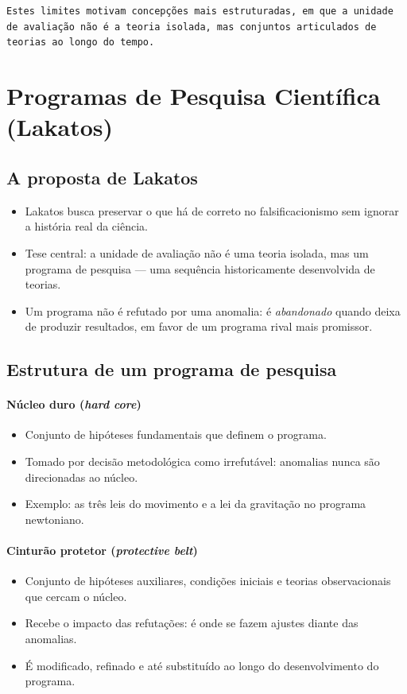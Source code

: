 \documentclass[9pt,a4paper]{extarticle}
\newcommand{\impt}[1]{\textcolor{important}{#1}}
\newcommand{\ntc}[1]{\textcolor{notice}{#1}}
\begin{document}
\texttt{Estes limites motivam concepções mais estruturadas, em que a unidade de avaliação não é a teoria isolada, mas conjuntos articulados de teorias ao longo do tempo.}

\section{Programas de Pesquisa Científica (Lakatos)}

\subsection{A proposta de Lakatos}

\begin{itemize}
    \item Lakatos busca preservar o que há de correto no falsificacionismo sem ignorar a história real da ciência.
    \item \ntc{Tese central}: a unidade de avaliação não é uma teoria isolada, mas um \impt{programa de pesquisa} --- uma sequência historicamente desenvolvida de teorias.
    \item Um programa não é refutado por uma anomalia: é \emph{abandonado} quando deixa de produzir resultados, em favor de um programa rival mais promissor.
\end{itemize}

\subsection{Estrutura de um programa de pesquisa}

\paragraph{Núcleo duro (\textit{hard core})}
\begin{itemize}
    \item Conjunto de hipóteses fundamentais que definem o programa.
    \item Tomado por decisão metodológica como \impt{irrefutável}: anomalias nunca são direcionadas ao núcleo.
    \item Exemplo: as três leis do movimento e a lei da gravitação no programa newtoniano.
\end{itemize}

\paragraph{Cinturão protetor (\textit{protective belt})}
\begin{itemize}
    \item Conjunto de hipóteses auxiliares, condições iniciais e teorias observacionais que cercam o núcleo.
    \item \impt{Recebe o impacto das refutações}: é onde se fazem ajustes diante das anomalias.
    \item É modificado, refinado e até substituído ao longo do desenvolvimento do programa.
\end{itemize}
\end{document}
